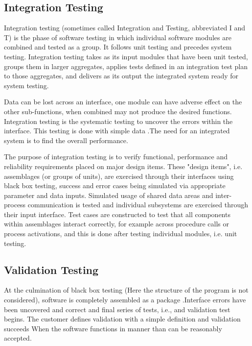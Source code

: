\documentclass[a4paper,12pt]{article}
\begin{document}
\subsection{Integration Testing}\vspace{2mm}
Integration testing (sometimes called Integration and Testing, abbreviated I and T) is the phase of software testing in which individual software modules are combined and tested as a group. It follows unit testing and precedes system testing. Integration testing takes as its input modules that have been unit tested, groups them in larger aggregates, applies tests defined in an integration test plan to those aggregates, and delivers as its output the integrated system ready for system testing.
\par\vspace{2mm}
Data can be lost across an interface, one module can have adverse effect on the other sub-functions, when combined may not produce the desired functions. Integration testing is the systematic testing to uncover the errors within the interface. This testing is done with simple data .The need for an integrated system is to find the overall performance.
\par\vspace{2mm}
The purpose of integration testing is to verify functional, performance and reliability requirements placed on major design items. These "design items", i.e. assemblages (or groups of units), are exercised through their interfaces using black box testing, success and error cases being simulated via appropriate parameter and data inputs. Simulated usage of shared data areas and inter-process communication is tested and individual subsystems are exercised through their input interface. Test cases are constructed to test that all components within assemblages interact correctly, for example across procedure calls or process activations, and this is done after testing individual modules, i.e. unit testing.
\subsection{Validation Testing}\vspace{2mm}
At the culmination of black box testing (Here the structure of the program is not considered), software is completely assembled as a package .Interface errors have been uncovered and correct and final series of tests, i.e., and validation test begins. The customer defines validation with a simple definition and validation succeeds  When the software functions in manner than can be reasonably accepted.
\end{document}
